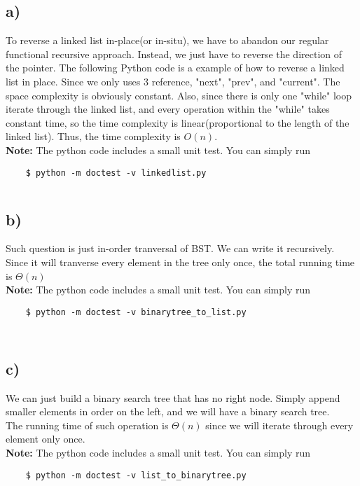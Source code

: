 \documentclass{article}
\begin{document}
\subsection*{a)}
To reverse a linked list in-place(or in-situ), we have to abandon our regular functional recursive approach.
Instead, we just have to reverse the direction of the pointer. The following Python code is a example of how
to reverse a linked list in place. Since we only uses 3 reference, "next", "prev", and "current". The space complexity is
obviously constant. Also, since there is only one "while" loop iterate through the linked list, and every operation within
the "while" takes constant time, so the time complexity is linear(proportional to the length of the linked list). Thus, the time
complexity is $O(n)$.\\
\textbf{Note:} The python code includes a small unit test. You can simply run
\begin{verbatim}
    $ python -m doctest -v linkedlist.py
\end{verbatim}
\begin{framed}
\inputminted{python}{linkedlist.py}
\end{framed}
\subsection*{b)}
Such question is just in-order tranversal of BST. We can write it recursively. Since it will
tranverse every element in the tree only once, the total running time is $\Theta(n)$\\
\textbf{Note:} The python code includes a small unit test. You can simply run
\begin{verbatim}
    $ python -m doctest -v binarytree_to_list.py
\end{verbatim}
\begin{framed}
    \inputminted{python}{binarytree.py}
\end{framed}
\begin{framed}
    \inputminted{python}{binarytree_to_list.py}
\end{framed}
\subsection*{c)}
We can just build a binary search tree that has no right node. Simply append smaller elements
in order on the left, and we will have a binary search tree.\\
The running time of such operation is $\Theta(n)$ since we will iterate through every element only
once. \\
\textbf{Note:} The python code includes a small unit test. You can simply run
\begin{verbatim}
    $ python -m doctest -v list_to_binarytree.py
\end{verbatim}
\begin{framed}
    \inputminted{python}{list_to_binarytree.py}
\end{framed}
\end{document}
